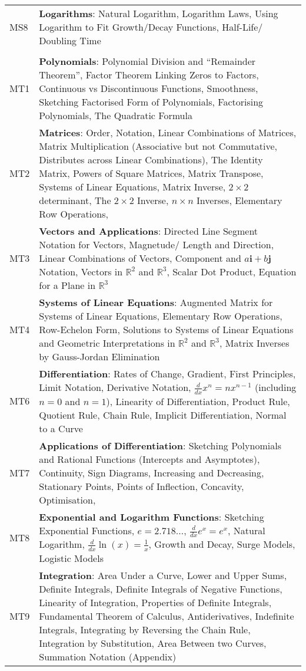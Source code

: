 \documentclass[varwidth=144mm, 12pt]{standalone}
\begin{document}
\begin{longtable}{lp{}}
MS8 & \textbf{Logarithms}: Natural Logarithm, Logarithm Laws, Using Logarithm to Fit Growth/Decay Functions, Half-Life/ Doubling Time\\
& \\
MT1 & \textbf{Polynomials}: Polynomial Division and ``Remainder Theorem'', Factor Theorem Linking Zeros to Factors, Continuous vs Discontinuous Functions, Smoothness, Sketching Factorised Form of Polynomials, Factorising Polynomials, The Quadratic Formula \\
MT2 & \textbf{Matrices}: Order, Notation, Linear Combinations of Matrices, Matrix Multiplication (Associative but not Commutative, Distributes across Linear Combinations), The Identity Matrix, Powers of Square Matrices, Matrix Transpose, Systems of Linear Equations, Matrix Inverse, $2 \times 2$ determinant, The $2 \times 2$ Inverse, $n \times n$ Inverses, Elementary Row Operations, \\
MT3 & \textbf{Vectors and Applications}: Directed Line Segment Notation for Vectors, Magnetude/ Length and Direction, Linear Combinations of Vectors, Component and $a\mathbf{i} + b\mathbf{j}$ Notation, Vectors in $\mathbb{R}^2$ and $\mathbb{R}^3$, Scalar Dot Product, Equation for a Plane in $\mathbb{R}^3$ \\
MT4 & \textbf{Systems of Linear Equations}: Augmented Matrix for Systems of Linear Equations, Elementary Row Operations, Row-Echelon Form, Solutions to Systems of Linear Equations and Geometric Interpretations in $\mathbb{R}^2$ and $\mathbb{R}^3$, Matrix Inverses by Gauss-Jordan Elimination \\
MT6 & \textbf{Differentiation}: Rates of Change, Gradient, First Principles, Limit Notation, Derivative Notation, $\frac{d}{dx}x^n = nx^{n-1}$ (including $n = 0$ and $n = 1$), Linearity of Differentiation, Product Rule, Quotient Rule, Chain Rule, Implicit Differentiation, Normal to a Curve \\
MT7 & \textbf{Applications of Differentiation}: Sketching Polynomials and Rational Functions (Intercepts and Asymptotes), Continuity, Sign Diagrams, Increasing and Decreasing, Stationary Points, Points of Inflection, Concavity, Optimisation, \\
MT8 & \textbf{Exponential and Logarithm Functions}: Sketching Exponential Functions, $e = 2.718\hdots$, $\frac{d}{dx}e^x = e^x$, Natural Logarithm, $\frac{d}{dx}\ln(x) = \frac{1}{x}$, Growth and Decay, Surge Models, Logistic Models \\
MT9 & \textbf{Integration}: Area Under a Curve, Lower and Upper Sums, Definite Integrals, Definite Integrals of Negative Functions, Linearity of Integration, Properties of Definite Integrals, Fundamental Theorem of Calculus, Antiderivatives, Indefinite Integrals, Integrating by Reversing the Chain Rule, Integration by Substitution, Area Between two Curves, Summation Notation (Appendix) \\
\end{longtable}
\end{document}
